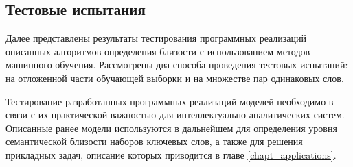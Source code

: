 
\subsection{Тестовые испытания}
Далее представлены результаты тестирования программных реализаций описанных алгоритмов определения близости с использованием методов машинного обучения. Рассмотрены два способа проведения тестовых испытаний: на отложенной части обучающей выборки и на множестве пар одинаковых слов.

Тестирование разработанных программных реализаций моделей необходимо в связи с их практической важностью для интеллектуально-аналитических систем. Описанные ранее модели используются в дальнейшем для определения уровня семантической близости наборов ключевых слов, а также для решения прикладных задач, описание которых приводится в главе \ref{chapt_applications}. 

